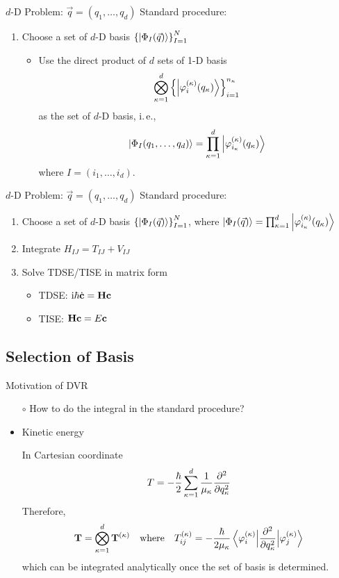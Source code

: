 \documentclass[12pt]{beamer}
\let\temp\phi
\let\phi\varphi
\let\varphi\temp
\newcommand{\iu}{\mathrm{i}}
\begin{document}
    \begin{frame}{$d$-D Problem: $\vec{q} = (q_1, \ldots, q_d)$}
        Standard procedure:
        \begin{enumerate}
            \item Choose a set of $d$-D basis $\left\{ \ket{\Phi_I(\vec{q})} \right\}^N_{I=1}$
            \begin{itemize}
                \item Use the direct product of $d$ sets of 1-D basis
                $$\bigotimes_{\kappa = 1}^{d} \left\{ \ket{\phi^{(\kappa)}_i(q_\kappa)} \right\}^{n_\kappa}_{i=1}$$
                as the set of $d$-D basis, i.\,e.,
                $$\ket{\Phi_I(q_1, \ldots, q_d)} = \prod_{\kappa=1}^d \ket{\phi^{(\kappa)}_{i_\kappa}(q_\kappa)}
                $$
                where $I = (i_1, \ldots, i_d)$.
            \end{itemize}
        \end{enumerate}
    \end{frame}

    \begin{frame}{$d$-D Problem: $\vec{q} = (q_1, \ldots, q_d)$}
        Standard procedure:
        \begin{enumerate}
            \item Choose a set of $d$-D basis $\left\{ \ket{\Phi_I(\vec{q})} \right\}^N_{I=1}$, where $\ket{\Phi_I(\vec{q})} = \prod_{\kappa=1}^d \ket{\phi^{(\kappa)}_{i_\kappa}(q_\kappa)}$
            \item Integrate $H_{IJ} = T_{IJ} + V_{IJ}$
            \item Solve TDSE/TISE in matrix form
            \begin{itemize}
                \item TDSE: $\iu \hbar \dot{\vb{c}} = \vb{H} \vb{c} $
                \item TISE: $\vb{H} \vb{c} = E \vb{c} $
            \end{itemize}
        \end{enumerate}
    \end{frame}

    \subsection{Selection of Basis}
    \begin{frame}{Motivation of DVR}
        \begin{itemize}
            \item[$\circ$] How to do the integral in the standard procedure?
            \item Kinetic energy
 
            In Cartesian coordinate
            $$T = - \frac{\hbar}{2} \sum_{\kappa=1}^d \frac{1}{\mu_\kappa} \pdv[2]{q_\kappa}$$
            Therefore,
            $$\vb{T} = \bigotimes_{\kappa=1}^{d}\vb{T}^{(\kappa)} \qq{where}
            T^{(\kappa)}_{ij} = - \frac{\hbar}{2 \mu_\kappa} \mel{\phi_i^{(\kappa)}}{\pdv[2]{q_\kappa}}{\phi_j^{(\kappa)}}$$
            which can be integrated analytically once the set of basis is determined.
        \end{itemize} 
    \end{frame}
\end{document}
